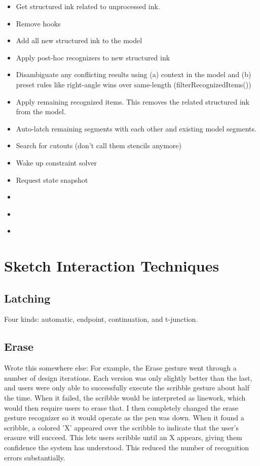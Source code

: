 \begin{itemize}
\item Get structured ink related to unprocessed ink.
\item Remove hooks
\item Add all new structured ink to the model
\item Apply post-hoc recognizers to new structured ink
\item Disambiguate any conflicting results using (a) context in the
  model and (b) preset rules like right-angle wins over same-length
  (filterRecognizedItems())
\item Apply remaining recognized items. This removes the related
  structured ink from the model.
\item Auto-latch remaining segments with each other and existing model
  segments.
\item Search for cutouts (don't call them stencils anymore)
\item Wake up constraint solver
\item Request state snapshot
\end{itemize}

\begin{itemize}
\item 
\end{itemize}

\begin{itemize}
\item 
\end{itemize}

\begin{itemize}
\item 
\end{itemize}

\section{Sketch Interaction Techniques}

\subsection{Latching}

Four kinds: automatic, endpoint, continuation, and t-junction.

\subsection{Erase}

Wrote this somewhere else: For example, the Erase gesture went through
a number of design iterations. Each version was only slightly better
than the last, and users were only able to successfully execute the
scribble gesture about half the time. When it failed, the scribble
would be interpreted as linework, which would then require users to
erase that. I then completely changed the erase gesture recognizer so
it would operate as the pen was down. When it found a scribble, a
colored 'X' appeared over the scribble to indicate that the user's
erasure will succeed. This lets users scribble until an X appears,
giving them confidence the system has understood. This reduced the
number of recognition errors substantially.


